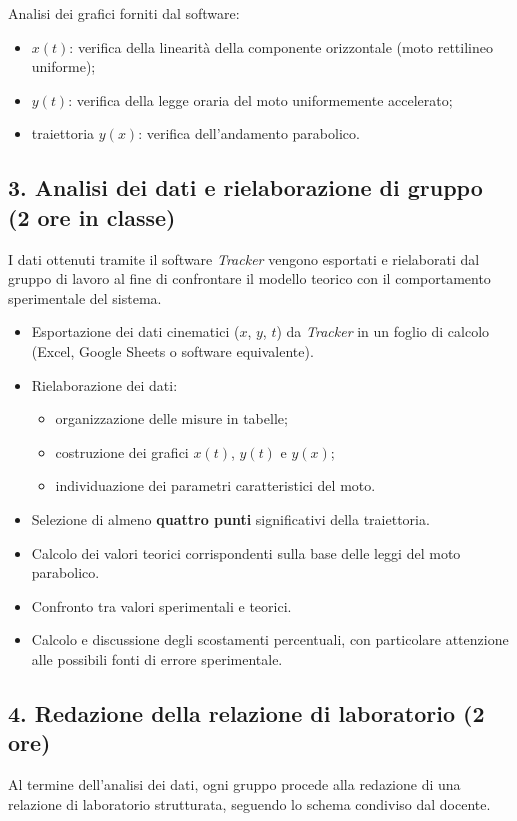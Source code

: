 \documentclass[11pt,a4paper]{article}
\begin{document}
Analisi dei grafici forniti dal software:
\begin{itemize}
    \item $x(t)$: verifica della linearità della componente orizzontale (moto rettilineo uniforme);
    \item $y(t)$: verifica della legge oraria del moto uniformemente accelerato;
    \item traiettoria $y(x)$: verifica dell’andamento parabolico.
\end{itemize}

\subsection*{3. Analisi dei dati e rielaborazione di gruppo (2 ore in classe)}
I dati ottenuti tramite il software \textit{Tracker} vengono esportati e rielaborati dal gruppo di lavoro al fine di confrontare il modello teorico con il comportamento sperimentale del sistema.

\begin{itemize}
    \item Esportazione dei dati cinematici ($x$, $y$, $t$) da \textit{Tracker} in un foglio di calcolo
    (Excel, Google Sheets o software equivalente).
    \item Rielaborazione dei dati:
    \begin{itemize}
        \item organizzazione delle misure in tabelle;
        \item costruzione dei grafici $x(t)$, $y(t)$ e $y(x)$;
        \item individuazione dei parametri caratteristici del moto.
    \end{itemize}
    \item Selezione di almeno \textbf{quattro punti} significativi della traiettoria.
    \item Calcolo dei valori teorici corrispondenti sulla base delle leggi del moto parabolico.
    \item Confronto tra valori sperimentali e teorici.
    \item Calcolo e discussione degli scostamenti percentuali, con particolare attenzione alle possibili fonti di errore sperimentale.
\end{itemize}


\subsection*{4. Redazione della relazione di laboratorio (2 ore)}
Al termine dell’analisi dei dati, ogni gruppo procede alla redazione di una relazione di laboratorio strutturata, seguendo lo schema condiviso dal docente.
\end{document}
